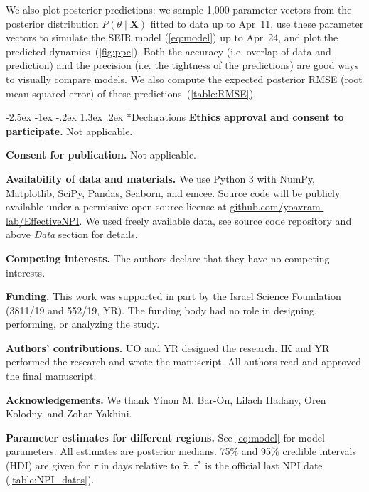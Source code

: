 \documentclass[12pt]{extarticle}
\makeatletter
\renewcommand\section{\@startsection {section}{1}{\z@}%
     {-2.5ex \@plus -1ex \@minus -.2ex}%
     {1.3ex \@plus.2ex}%
    {\Large\bfseries}}
\let\vec\mathbf
\makeatother
\begin{document}
{We also plot posterior predictions: we sample 1,000 parameter vectors from the posterior distribution $P(\theta \mid \vec{X})$ fitted to data up to Apr~11, use these parameter vectors to simulate the SEIR model (\autoref{eq:model}) up to Apr~24, and plot the predicted dynamics~(\autoref{fig:ppc}).
Both the accuracy (i.e. overlap of data and prediction) and the precision (i.e. the tightness of the predictions) are good ways to visually compare models.
We also compute the expected posterior RMSE (root mean squared error) of these predictions~(\autoref{table:RMSE}).
} %

{\small
\section*{Declarations}
\textbf{Ethics approval and consent to participate.} Not applicable.

\textbf{Consent for publication.} Not applicable.

\textbf{Availability of data and materials.} We use Python 3 with NumPy, Matplotlib, SciPy, Pandas, Seaborn, and emcee.
Source code will be publicly available under a permissive open-source license at \href{http://github.com/yoavram-lab/EffectiveNPI}{github.com/yoavram-lab/EffectiveNPI}.
We used freely available data, see source code repository and above \emph{Data} section for details.

\textbf{Competing interests.} The authors declare that they have no competing interests.

\textbf{Funding.} This work was supported in part by the Israel Science Foundation (3811/19 and 552/19, YR). The funding body had no role in designing, performing, or analyzing the study.

\textbf{Authors' contributions.} UO and YR designed the research. IK and YR performed the research and wrote the manuscript. All authors read and approved the final manuscript.

\textbf{Acknowledgements.} 
We thank Yinon M. Bar-On, Lilach Hadany, Oren Kolodny, and Zohar Yakhini. %
} %

\begin{landscape}
\begin{table}[]
\centering
\footnotesize{

}
\caption{
\textbf{Parameter estimates for different regions.}
See \autoref{eq:model} for model parameters.
All estimates are posterior medians.
75\% and 95\% credible intervals (HDI) are given for $\tau$ in days relative to $\hat{\tau}$.
$\tau^*$ is the official last NPI date (\autoref{table:NPI_dates}).
}
\label{table:estimated-params}
\end{table}
\end{landscape}
\end{document}
